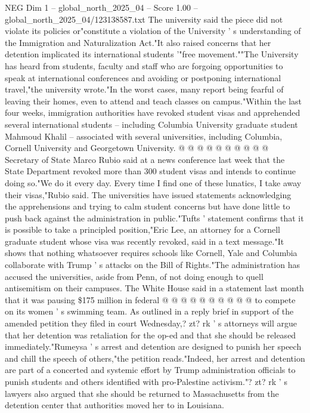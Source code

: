 \begin{textsample}{NEG Dim 1 – global\_north\_2025\_04 – Score 1.00 – global\_north\_2025\_04/123138587.txt}
The university said the piece did not violate its policies or"constitute a violation of the University ' s understanding of the Immigration and Naturalization Act."It also raised concerns that her detention implicated its international students '"free movement.""The University has heard from students, faculty and staff who are forgoing opportunities to speak at international conferences and avoiding or postponing international travel,"the university wrote."In the worst cases, many report being fearful of leaving their homes, even to attend and teach classes on campus."Within the last four weeks, immigration authorities have revoked student visas and apprehended several international students -- including Columbia University graduate student Mahmoud Khalil -- associated with several universities, including Columbia, Cornell University and Georgetown University. @ @ @ @ @ @ @ @ @ @ Secretary of State Marco Rubio said at a news conference last week that the State Department revoked more than 300 student visas and intends to continue doing so."We do it every day.
Every time I find one of these lunatics, I take away their visas,"Rubio said.
The universities have issued statements acknowledging the apprehensions and trying to calm student concerns but have done little to push back against the administration in public."Tufts ' statement confirms that it is possible to take a principled position,"Eric Lee, an attorney for a Cornell graduate student whose visa was recently revoked, said in a text message."It shows that nothing whatsoever requires schools like Cornell, Yale and Columbia collaborate with Trump ' s attacks on the Bill of Rights."The administration has accused the universities, aside from Penn, of not doing enough to quell antisemitism on their campuses.
The White House said in a statement last month that it was pausing \$175 million in federal @ @ @ @ @ @ @ @ @ @ to compete on its women ' s swimming team.
As outlined in a reply brief in support of the amended petition they filed in court Wednesday,? zt? rk ' s attorneys will argue that her detention was retaliation for the op-ed and that she should be released immediately."Rumeysa ' s arrest and detention are designed to punish her speech and chill the speech of others,"the petition reads."Indeed, her arrest and detention are part of a concerted and systemic effort by Trump administration officials to punish students and others identified with pro-Palestine activism."? zt? rk ' s lawyers also argued that she should be returned to Massachusetts from the detention center that authorities moved her to in Louisiana.

\end{textsample}
